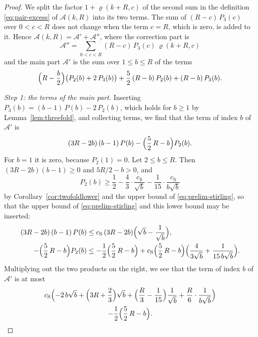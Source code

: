 \documentclass{amsart}
\theoremstyle{definition}
\theoremstyle{remark}
\numberwithin{equation}{section}
\begin{document}
\begin{proof}
We split the factor $1+\varrho(k+R,c)$ of the second sum in the definition
\eqref{eq:pair-excess} of $\mathcal A(k,R)$ into its two terms. The sum of
$(R-c)\,P_3(c)$ over $0<c<R$ does not change when the term $c=R$, which is
zero, is added to it. Hence
$\mathcal A(k,R)=\mathcal A'+\mathcal A''$, where the correction part is
\[
\mathcal A''=\sum_{0<c<R}(R-c)\,P_3(c)\,\varrho(k+R,c)
\]
and the main part $\mathcal A'$ is the sum over $1\le b\le R$ of the terms
\[
\Bigl(R-\frac b2\Bigr)\bigl(P_2(b)+2\,P_3(b)\bigr)
+\frac52\,(R-b)\,P_2(b)+(R-b)\,P_3(b).
\]

\emph{Step 1: the terms of the main part.}
Inserting $P_3(b)=(b-1)\,P(b)-2\,P_2(b)$, which holds for $b\ge1$ by
Lemma~\ref{lem:threefold}, and collecting terms, we find that the term of
index $b$ of $\mathcal A'$ is
\[
(3R-2b)\,(b-1)\,P(b)-\Bigl(\frac52\,R-b\Bigr)P_2(b).
\]
For $b=1$ it is zero, because $P_2(1)=0$. Let $2\le b\le R$. Then
$(3R-2b)(b-1)\ge0$ and $5R/2-b>0$, and
\[
P_2(b)\ge\frac12-\frac43\cdot\frac{c_{\mathrm S}}{\sqrt b}
-\frac1{15}\cdot\frac{c_{\mathrm S}}{b\sqrt b}
\]
by Corollary~\ref{cor:twofoldlower} and the upper bound of
\eqref{eq:prelim-stirling}, so that the upper bound of
\eqref{eq:prelim-stirling} and this lower bound may be inserted:
\begin{align*}
(3R-2b)\,(b-1)\,P(b)
&\le c_{\mathrm S}\,(3R-2b)\Bigl(\sqrt b-\frac1{\sqrt b}\Bigr),\\
-\Bigl(\frac52\,R-b\Bigr)P_2(b)
&\le-\frac12\Bigl(\frac52\,R-b\Bigr)
+c_{\mathrm S}\Bigl(\frac52\,R-b\Bigr)
\Bigl(\frac4{3\sqrt b}+\frac1{15\,b\sqrt b}\Bigr).
\end{align*}
Multiplying out the two products on the right, we see that the term of
index $b$ of $\mathcal A'$ is at most
\begin{multline*}
c_{\mathrm S}\Bigl(-2\,b\sqrt b+\Bigl(3R+\frac23\Bigr)\sqrt b
+\Bigl(\frac R3-\frac1{15}\Bigr)\frac1{\sqrt b}
+\frac R6\cdot\frac1{b\sqrt b}\Bigr)\\
-\frac12\Bigl(\frac52\,R-b\Bigr).
\end{multline*}


\end{proof}
\end{document}
